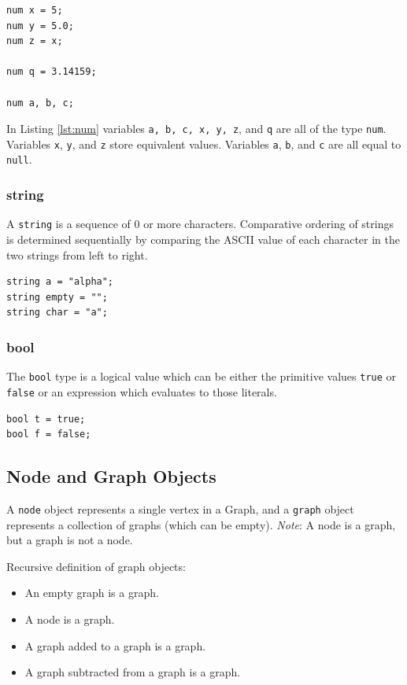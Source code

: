 \documentclass{article}
\newcommand{\code}[1]{\texttt{#1}} %
\begin{document}
\begin{lstlisting}[language=pltLang, caption=Declaration of ``num'' types., label=lst:num]
num x = 5;
num y = 5.0;
num z = x;

num q = 3.14159;

num a, b, c;
\end{lstlisting}

In Listing \ref{lst:num} variables \code{a, b, c, x, y, z}, and \code{q} are all of the type \code{num}. Variables \code{x}, \code{y}, and \code{z} store equivalent values. Variables \code{a}, \code{b}, and \code{c} are all equal to \code{null}.

\subsubsection{string}

A \code{string} is a sequence of 0 or more characters. Comparative ordering of strings is determined sequentially by comparing the ASCII value of each character in the two strings from left to right.

\begin{lstlisting}[language=pltLang, caption=Declaration of ``string'' types., label=lst:string]
string a = "alpha";
string empty = "";
string char = "a";
\end{lstlisting}

\subsubsection{bool}

The \code{bool} type is a logical value which can be either the primitive values \code{true} or \code{false} or an expression which evaluates to those literals.

\begin{lstlisting}[language=pltLang, caption=Declaration of ``bool'' types., label=lst:bool]
bool t = true;
bool f = false;
\end{lstlisting}

\subsection{Node and Graph Objects}

A \code{node} object represents a single vertex in a Graph, and a \code{graph} object represents a collection of graphs (which can be empty). \emph{Note}: A node is a graph, but a graph is not a node.

Recursive definition of graph objects:
\begin{itemize}
\item An empty graph is a graph.
\item A node is a graph.
\item A graph added to a graph is a graph.
\item A graph subtracted from a graph is a graph.
\end{itemize}
\end{document}
